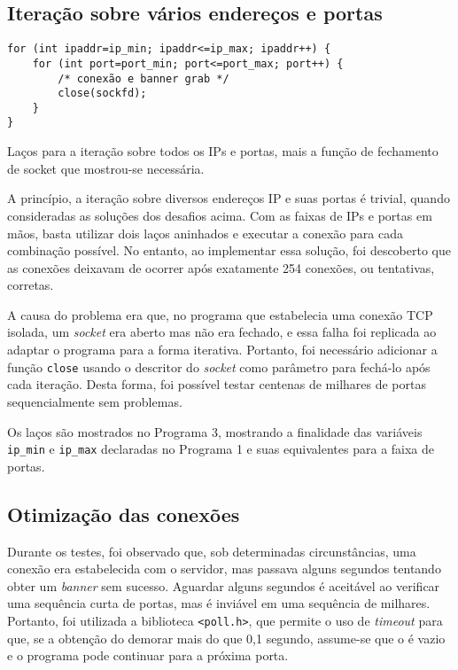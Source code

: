 \documentclass{sig-alternate-05-2015}
\begin{document}
\subsection{Iteração sobre vários endereços e portas}
\begin{program}
\begin{lstlisting}
for (int ipaddr=ip_min; ipaddr<=ip_max; ipaddr++) {
	for (int port=port_min; port<=port_max; port++) {
		/* conexão e banner grab */
		close(sockfd);
	}
}
\end{lstlisting}
\caption{Laços para a iteração sobre todos os IPs e portas, mais a função de fechamento de socket que mostrou-se necessária.}
\end{program}

A princípio, a iteração sobre diversos endereços IP e suas portas é trivial, quando consideradas as soluções dos desafios acima.
Com as faixas de IPs e portas em mãos, basta utilizar dois laços aninhados e executar a conexão para cada combinação possível.
No entanto, ao implementar essa solução, foi descoberto que as conexões deixavam de ocorrer após exatamente 254 conexões, ou tentativas, corretas.

A causa do problema era que, no programa que estabelecia uma conexão TCP isolada, um \textit{socket} era aberto mas não era fechado, e essa falha foi replicada ao adaptar o programa para a forma iterativa.
Portanto, foi necessário adicionar a função \texttt{close} usando o descritor do \textit{socket} como parâmetro para fechá-lo após cada iteração. Desta forma, foi possível testar centenas de milhares de portas sequencialmente sem problemas.

Os laços são mostrados no Programa 3, mostrando a finalidade das variáveis \texttt{ip\_min} e \texttt{ip\_max} declaradas no Programa 1 e suas equivalentes para a faixa de portas.

\subsection{Otimização das conexões}
Durante os testes, foi observado que, sob determinadas circunstâncias, uma conexão era estabelecida com o servidor, mas passava alguns segundos tentando obter um \textit{banner} sem sucesso.
Aguardar alguns segundos é aceitável ao verificar uma sequência curta de portas, mas é inviável em uma sequência de milhares.
Portanto, foi utilizada a biblioteca \texttt{<poll.h>}, que permite o uso de \textit{timeout} para que, se a obtenção do \banner demorar mais do que 0,1 segundo, assume-se que o \banner é vazio e o programa pode continuar para a próxima porta.
\end{document}
